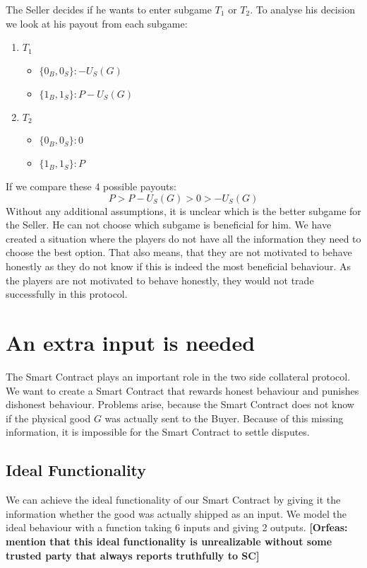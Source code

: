 \documentclass{cacthesis}
\newcommand{\authnote}[3]{{ \footnotesize \textbf{#1[#2: #3]~}}}
\newcommand{\orfnote}[1]{\authnote{\color{blue}}{Orfeas}{#1}}
\begin{document}
The Seller decides if he wants to enter subgame $T_1$ or $T_2$. To analyse his decision we look at his payout from each subgame:\newline
\begin{enumerate}
    \item $T_1$
        \begin{itemize}
            \item $\{0_B, 0_S\}: -U_S(G)$
            \item $\{1_B, 1_S\}: P-U_S(G)$
        \end{itemize}
    \item $T_2$
        \begin{itemize}
            \item $\{0_B, 0_S\}: 0$
            \item $\{1_B, 1_S\}: P$
        \end{itemize}
\end{enumerate}
If we compare these 4 possible payouts:
\[P > P-U_S(G) > 0 > -U_S(G)\]
Without any additional assumptions, it is unclear which is the better subgame for the Seller. He can not choose which subgame is beneficial for him. \newline
We have created a situation where the players do not have all the information they need to choose the best option. That also means, that they are not motivated to behave honestly as they do not know if this is indeed the most beneficial behaviour. As the players are not motivated to behave honestly, they would not trade successfully in this protocol.

\section{An extra input is needed}
The Smart Contract plays an important role in the two side collateral protocol. We want to create a Smart Contract that rewards honest behaviour and punishes dishonest behaviour.\newline 
Problems arise, because the Smart Contract does not know if the physical good $G$ was actually sent to the Buyer. Because of this missing information, it is impossible for the Smart Contract to settle disputes.
\subsection{Ideal Functionality}
We can achieve the ideal functionality of our Smart Contract by giving it the
information whether the good was actually shipped as an input. We model the
ideal behaviour with a function taking 6 inputs and giving 2 outputs.
\orfnote{mention that this ideal functionality is unrealizable without some
trusted party that always reports truthfully to SC}
\end{document}
